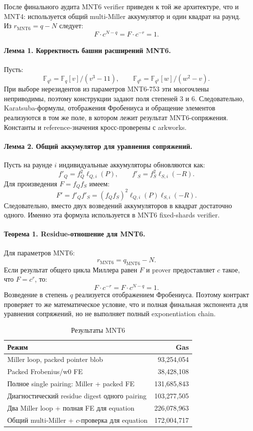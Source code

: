 \documentclass[12pt,a4paper]{article}
\newcommand{\Fq}{\mathbb{F}_q}
\begin{document}
После финального аудита MNT6 verifier приведен к той же архитектуре, что и
MNT4: используется общий multi-Miller аккумулятор и один квадрат на раунд.
Из $r_{\mathrm{MNT6}}=q-N$ следует:
\[
    F\cdot c^{N-q}=F\cdot c^{-r}=1.
\]

\paragraph{Лемма 1. Корректность башни расширений MNT6.}
Пусть:
\[
    \mathbb{F}_{q^3}=\Fq[v]/(v^3-11),
    \qquad
    \mathbb{F}_{q^6}=\mathbb{F}_{q^3}[w]/(w^2-v).
\]
При выборе нерезидентов из параметров MNT6-753 эти многочлены неприводимы,
поэтому конструкции задают поля степеней $3$ и $6$. Следовательно,
Karatsuba-формулы, отображения Фробениуса и обращение элементов реализуются в
том же поле, в котором лежит результат MNT6-сопряжения. Константы и
reference-значения кросс-проверены с arkworks.

\paragraph{Лемма 2. Общий аккумулятор для уравнения сопряжений.}
Пусть на раунде $i$ индивидуальные аккумуляторы обновляются как:
\[
    f'_{Q}=f_Q^2\ell_{Q,i}(P),
    \qquad
    f'_{S}=f_S^2\ell_{S,i}(-R).
\]
Для произведения $F=f_Qf_S$ имеем:
\[
    F'
    =
    f'_Qf'_S
    =
    (f_Qf_S)^2
    \ell_{Q,i}(P)\ell_{S,i}(-R).
\]
Следовательно, вместо двух возведений аккумуляторов в квадрат достаточно
одного. Именно эта формула используется в MNT6 fixed-shards verifier.

\paragraph{Теорема 1. Residue-отношение для MNT6.}
Для параметров MNT6:
\[
    r_{\mathrm{MNT6}}=q_{\mathrm{MNT6}}-N.
\]
Если результат общего цикла Миллера равен $F$ и prover предоставляет
$c$ такое, что $F=c^r$, то:
\[
    F\cdot c^{-r}
    =
    F\cdot c^{N-q}
    =
    1.
\]
Возведение в степень $q$ реализуется отображением Фробениуса. Поэтому
контракт проверяет то же математическое условие, что и полная финальная
экспонента для уравнения сопряжений, но не выполняет полный exponentiation
chain.

\begin{table}[htbp]
\centering
\caption{Результаты MNT6}
\small
\begin{tabularx}{\linewidth}{Y r}
\toprule
Режим & Gas \\
\midrule
Miller loop, packed pointer blob & 93,254,054 \\
Packed Frobenius/w0 FE & 38,428,108 \\
Полное single pairing: Miller + packed FE & 131,685,843 \\
Диагностический residue digest одного pairing & 103,277,505 \\
Два Miller loop + полная FE для equation & 226,078,963 \\
Общий multi-Miller + $c$-проверка для equation & 172,004,717 \\
\bottomrule
\end{tabularx}
\end{table}
\end{document}
